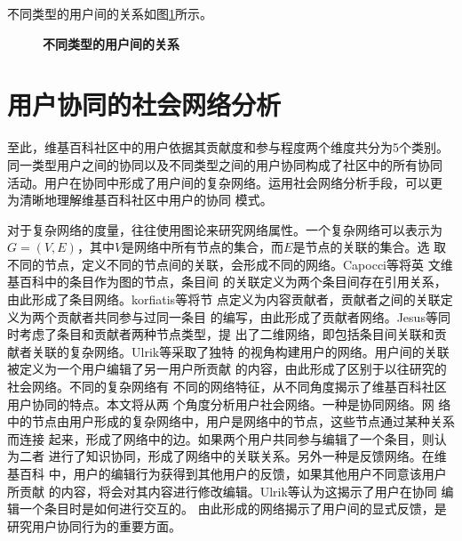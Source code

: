 不同类型的用户间的关系如图\ref{fig:user-cat}所示。
\begin{figure}[htb]
  \centering
  \caption{\small{\textbf{不同类型的用户间的关系}}}
  \label{fig:user-cat}
\end{figure}
\section{用户协同的社会网络分析}
\label{sec:social-analysis}


至此，维基百科社区中的用户依据其贡献度和参与程度两个维度共分为5个类别。
同一类型用户之间的协同以及不同类型之间的用户协同构成了社区中的所有协同
活动。用户在协同中形成了用户间的复杂网络。运用社会网络分析手段，可以更
为清晰地理解维基百科社区中用户的协同
模式。

对于复杂网络的度量，往往使用图论来研究网络属性。一个复杂网络可以表示为
$G=(V,E)$，其中$V$是网络中所有节点的集合，而$E$是节点的关联的集合。选
取不同的节点，定义不同的节点间的关联，会形成不同的网络。Capocci等将英
文维基百科中的条目作为图的节点，条目间
的关联定义为两个条目间存在引用关系，由此形成了条目网络\cite{PhysRevE.74.036116}。korfiatis等将节
点定义为内容贡献者，贡献者之间的关联定义为两个贡献者共同参与过同一条目
的编写，由此形成了贡献者网络\cite{korfiatis2006evaluating}。Jesus等同时考虑了条目和贡献者两种节点类型，提
出了二维网络，即包括条目间关联和贡献者关联的复杂网络\cite{jesus2009bipartite}。Ulrik等采取了独特
的视角构建用户的网络。用户间的关联被定义为一个用户编辑了另一用户所贡献
的内容，由此形成了区别于以往研究的社会网络\cite{1526808}。不同的复杂网络有
不同的网络特征，从不同角度揭示了维基百科社区用户协同的特点。本文将从两
个角度分析用户社会网络。一种是协同网络。网
络中的节点由用户形成的复杂网络中，用户是网络中的节点，这些节点通过某种关系而连接
起来，形成了网络中的边。如果两个用户共同参与编辑了一个条目，则认为二者
进行了知识协同，形成了网络中的关联关系。另外一种是反馈网络。在维基百科
中，用户的编辑行为获得到其他用户的反馈，如果其他用户不同意该用户所贡献
的内容，将会对其内容进行修改编辑。Ulrik等认为这揭示了用户在协同
编辑一个条目时是如何进行交互的\cite{1526808}。
由此形成的网络揭示了用户间的显式反馈，是研究用户协同行为的重要方面。

